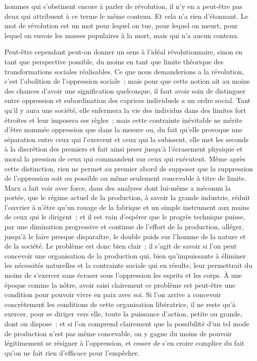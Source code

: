\documentclass[french,twoside]{book} %
\begin{document}
hommes qui s'obstinent encore à parler de révolution, il n'y en a peut-être pas deux qui attribuent à ce terme le même contenu. Et cela n'a rien d'étonnant. Le mot de révolution est un mot pour lequel on tue, pour lequel on meurt, pour lequel on envoie les masses populaires à la mort, mais qui n'a aucun contenu.\par
Peut-être cependant peut-on donner un sens à l'idéal révolutionnaire, sinon en tant que perspective possible, du moins en tant que limite théorique des transformations sociales réalisables. Ce que nous demanderions a la révolution, c'est l'abolition de l'oppression sociale ; mais pour que cette notion ait au moins des chances d'avoir une signification quelconque, il faut avoir soin de distinguer entre oppression et subordination des caprices individuels a un ordre social. Tant qu'il y aura une société, elle enfermera la vie des individus dans des limites fort étroites et leur imposera ses règles ; mais cette contrainte inévitable ne mérite d'être nommée oppression que dans la mesure ou, du fait qu’elle provoque une séparation entre ceux qui l'exercent et ceux qui la subissent, elle met les seconds à la discrétion des premiers et fait ainsi peser jusqu'à l'écrasement physique et moral la pression de ceux qui commandent sur ceux qui exécutent. Même après cette distinction, rien ne permet au premier abord de supposer que la suppression de l'oppression soit ou possible ou même seulement concevable à titre de limite. Marx a fait voir avec force, dans des analyses dont lui-même a méconnu la portée, que le régime actuel de la production, à savoir la grande industrie, réduit l'ouvrier à n'être qu’un rouage de la fabrique et un simple instrument aux mains de ceux qui le dirigent ; et il est vain d'espérer que le progrès technique puisse, par une diminution progressive et continue de l'effort de la production, alléger, jusqu'à le faire presque disparaître, le double poids sur l'homme de la nature et de la société. Le problème est donc bien clair ; il s'agit de savoir si l'on peut concevoir une organisation de la production qui, bien qu'impuissante à éliminer les nécessités naturelles et la contrainte sociale qui en résulte, leur permettrait du moins de s'exercer sans écraser sous l'oppression les esprits et les corps. À une époque comme la nôtre, avoir saisi clairement ce problème est peut-être une condition pour pouvoir vivre en paix avec soi. Si l'on arrive a concevoir concrètement les conditions de cette organisation libératrice, il ne reste qu'à exercer, pour se diriger vers elle, toute la puissance d'action, petite ou grande, dont on dispose ; et si l'on comprend clairement que la possibilité d'un tel mode de production n'est pas même concevable, on y gagne du moins de pouvoir légitimement se résigner à l'oppression, et cesser de s'en croire complice du fait qu'on ne fait rien d'efficace pour l'empêcher.
\end{document}
